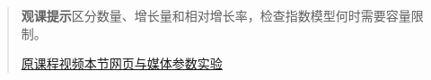 \begin{quote}\small\textbf{观课提示}\quad 区分数量、增长量和相对增长率，检查指数模型何时需要容量限制。

\href{https://www.youtube.com/watch?v=Kas0tIxDvrg}{原课程视频}\quad\href{https://vitael04213.github.io/3blue1brown-notes/lessons/exponential-and-epidemics.html}{本节网页与媒体}\quad\href{https://vitael04213.github.io/3blue1brown-notes/lab.html\#phase}{参数实验}
\end{quote}
